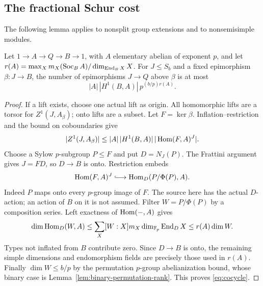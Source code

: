 \subsection{The fractional Schur cost}
The following lemma applies to nonsplit group extensions and to
nonsemisimple modules.
\begin{lemma}\label{lem:cocycle}
Let $1\to A\to Q\to B\to1$, with $A$ elementary abelian of exponent
$p$, and let
$r(A)=\max_Xm_X(\operatorname{Soc}_B A)/\dim_{\operatorname{End}_BX}X$.
For $J\leq S_b$ and a fixed epimorphism $\beta:J\to B$, the number
of epimorphisms $J\to Q$ above $\beta$ is at most
\begin{equation}\label{eq:cocycle}
 |A|\,|H^1(B,A)|\,p^{(b/p)r(A)}.
\end{equation}
\end{lemma}
\begin{proof}
If a lift exists, choose one actual lift as origin. All homomorphic
lifts are a torsor for $Z^1(J,A_\beta)$; onto lifts are a subset.
Let $F=\ker\beta$. Inflation--restriction and the bound on
coboundaries give
\[
 |Z^1(J,A_\beta)|\leq|A|\,|H^1(B,A)|\,|\operatorname{Hom}(F,A)^J|.
\]
Choose a Sylow $p$-subgroup $P\leq F$ and put $D=N_J(P)$.
The Frattini argument gives $J=FD$, so $D\to B$ is onto.
Restriction embeds
\[
 \Hom(F,A)^J\lhook\joinrel\longrightarrow
 \Hom_D(P/\Phi(P),A).
\]
Indeed $P$ maps onto every $p$-group image of $F$.
The source here has the actual $D$-action; an action of $B$ on it
is not assumed. Filter $W=P/\Phi(P)$ by a composition series.
Left exactness of $\operatorname{Hom}(-,A)$ gives
\[
 \dim\operatorname{Hom}_D(W,A)\leq
 \sum_X[W:X]m_X\dim_{\mathbb F_p}\operatorname{End}_DX\leq r(A)\dim W.
\]
Types not inflated from $B$ contribute zero. Since $D\to B$ is onto,
the remaining simple dimensions and endomorphism fields are precisely
those used in $r(A)$. Finally $\dim W\leq b/p$ by the permutation
$p$-group abelianization bound, whose binary case is
Lemma~\ref{lem:binary-permutation-rank}. This proves \eqref{eq:cocycle}.
\end{proof}

